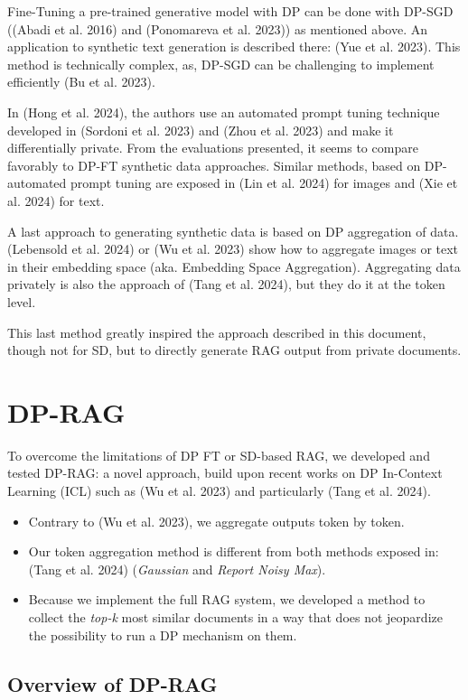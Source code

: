\documentclass[
  12pt,
  a4paper,
]{article}
\providecommand{\tightlist}{%
  \setlength{\itemsep}{0pt}\setlength{\parskip}{0pt}}
\begin{document}
Fine-Tuning a pre-trained generative model with DP can be done with
DP-SGD ((Abadi et al. 2016) and (Ponomareva et al. 2023)) as mentioned
above. An application to synthetic text generation is described there:
(Yue et al. 2023). This method is technically complex, as, DP-SGD can be
challenging to implement efficiently (Bu et al. 2023).

In (Hong et al. 2024), the authors use an automated prompt tuning
technique developed in (Sordoni et al. 2023) and (Zhou et al. 2023) and
make it differentially private. From the evaluations presented, it seems
to compare favorably to DP-FT synthetic data approaches. Similar
methods, based on DP-automated prompt tuning are exposed in (Lin et al.
2024) for images and (Xie et al. 2024) for text.

A last approach to generating synthetic data is based on DP aggregation
of data.(Lebensold et al. 2024) or (Wu et al. 2023) show how to
aggregate images or text in their embedding space (aka. Embedding Space
Aggregation). Aggregating data privately is also the approach of (Tang
et al. 2024), but they do it at the token level.

This last method greatly inspired the approach described in this
document, though not for SD, but to directly generate RAG output from
private documents.

\section{DP-RAG}\label{dp-rag}

To overcome the limitations of DP FT or SD-based RAG, we developed and
tested DP-RAG: a novel approach, build upon recent works on DP
In-Context Learning (ICL) such as (Wu et al. 2023) and particularly
(Tang et al. 2024).

\begin{itemize}
\tightlist
\item
  Contrary to (Wu et al. 2023), we aggregate outputs token by token.
\item
  Our token aggregation method is different from both methods exposed
  in: (Tang et al. 2024) (\emph{Gaussian} and \emph{Report Noisy Max}).
\item
  Because we implement the full RAG system, we developed a method to
  collect the \emph{top-k} most similar documents in a way that does not
  jeopardize the possibility to run a DP mechanism on them.
\end{itemize}

\subsection{Overview of DP-RAG}\label{overview-of-dp-rag}
\end{document}
